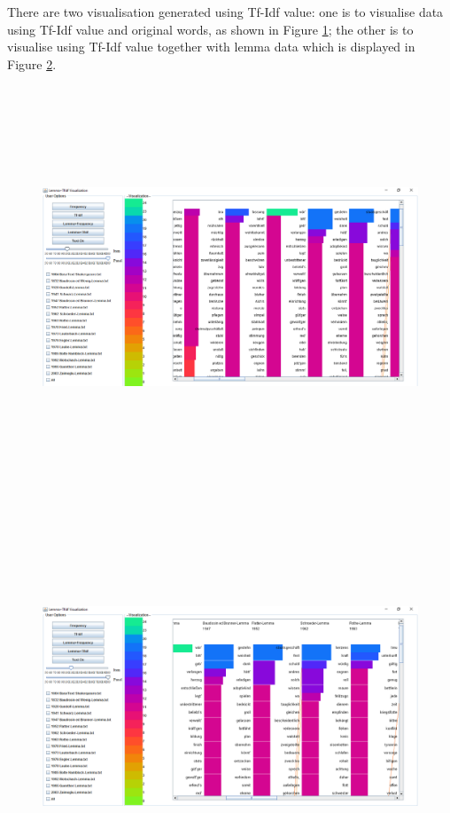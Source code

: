 There are two visualisation generated using Tf-Idf value: one is to visualise data using Tf-Idf value and original words, as shown in Figure \ref{fig:tfIdfView}; the other is to visualise using Tf-Idf value together with lemma data which is displayed in Figure \ref{fig:tfIdfLemma}.

\begin{figure}[h]
	\centering	
	\includegraphics[width=16cm, height=12cm]{Figs/Lemma-Frequency}\\[1ex]
	\caption{}
	\label{fig:tfIdfView}
\end{figure} 
\begin{figure}[h]
	\centering	
	\includegraphics[width=16cm, height=12cm]{Figs/Lemma-TfIdf}\\[1ex]
	\caption{}
	\label{fig:tfIdfLemma}
\end{figure} 


